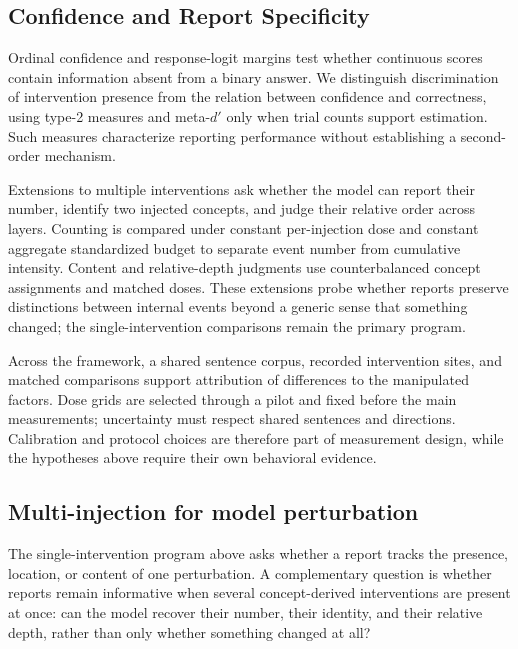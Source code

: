 \subsection{Confidence and Report Specificity}

Ordinal confidence and response-logit margins test whether continuous scores contain information absent from a binary answer.
We distinguish discrimination of intervention presence from the relation between confidence and correctness, using type-2 measures and meta-$d'$ only when trial counts support estimation.
Such measures characterize reporting performance without establishing a second-order mechanism.

Extensions to multiple interventions ask whether the model can report their number, identify two injected concepts, and judge their relative order across layers.
Counting is compared under constant per-injection dose and constant aggregate standardized budget to separate event number from cumulative intensity.
Content and relative-depth judgments use counterbalanced concept assignments and matched doses.
These extensions probe whether reports preserve distinctions between internal events beyond a generic sense that something changed; the single-intervention comparisons remain the primary program.

Across the framework, a shared sentence corpus, recorded intervention sites, and matched comparisons support attribution of differences to the manipulated factors.
Dose grids are selected through a pilot and fixed before the main measurements; uncertainty must respect shared sentences and directions.
Calibration and protocol choices are therefore part of measurement design, while the hypotheses above require their own behavioral evidence.

\subsection{Multi-injection for model perturbation}
\label{sec:multi-injection-approach}

The single-intervention program above asks whether a report tracks the presence, location, or content of one perturbation.
A complementary question is whether reports remain informative when several concept-derived interventions are present at once: can the model recover their number, their identity, and their relative depth, rather than only whether something changed at all?

